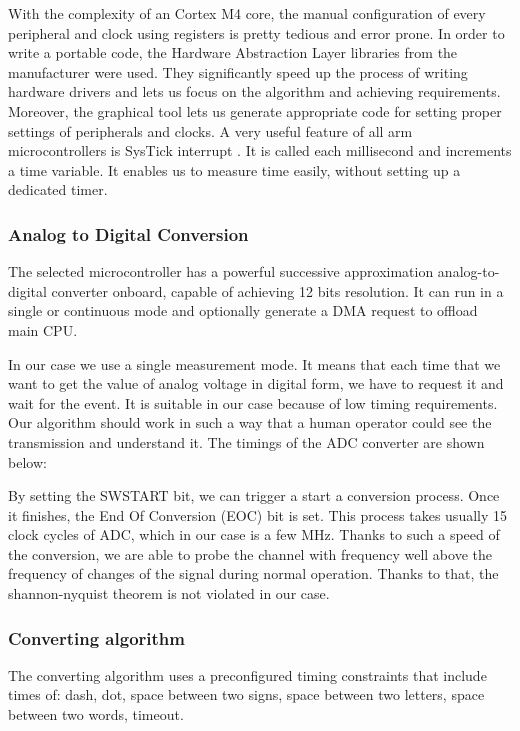 \documentclass[12pt]{article}
\begin{document}
  With the complexity of an Cortex M4 core, the manual configuration of every peripheral and clock using registers is pretty tedious and error prone. In order to write a portable
  code, the Hardware Abstraction Layer libraries from the manufacturer were used. They significantly speed up the process of writing hardware drivers and lets us focus
  on the algorithm and achieving requirements. Moreover, the graphical tool lets us generate appropriate code for setting proper settings of peripherals and clocks.
  A very useful feature of all arm microcontrollers is SysTick interrupt \cite{stm32reference}. It is called each millisecond and increments a time variable.
  It enables us to measure time easily, without setting up a dedicated timer.

  \subsubsection{Analog to Digital Conversion}
  The selected microcontroller has a powerful successive approximation analog-to-digital converter onboard, capable of achieving 12 bits resolution.
  It can run in a single or continuous mode and optionally generate a DMA request to offload main CPU.


  In our case we use a single measurement mode. It means that each time that we want to get the value of analog voltage in digital form, we have to request it and wait for the event.
  It is suitable in our case because of low timing requirements. Our algorithm should work in such a way that a human operator could see the transmission and understand it.
  The timings of the ADC converter are shown below:
  
  
  By setting the SWSTART bit, we can trigger a start a conversion process. Once it finishes, the End Of Conversion (EOC) bit is set.
  This process takes usually 15 clock cycles of ADC, which in our case is a few MHz.
  Thanks to such a speed of the conversion, we are able to probe the channel with frequency well above the frequency of changes of the signal during normal
  operation. Thanks to that, the shannon-nyquist theorem is not violated in our case.

  \subsubsection{Converting algorithm}
  The converting algorithm uses a preconfigured timing constraints that include times of: dash, dot, space between two signs, space between two letters, space between two words, timeout.
  \vspace{10pt}
\end{document}
